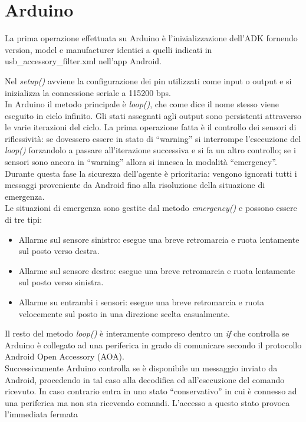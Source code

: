 \section {Arduino} 
La prima operazione effettuata su Arduino è l'inizializzazione dell'ADK fornendo 
version, model e manufacturer identici a quelli indicati in usb\_accessory\_filter.xml 
nell'app Android.

Nel \emph{setup()} avviene la configurazione dei pin utilizzati come input o output e si inizializza
la connessione seriale a 115200 bps.\\
In Arduino il metodo principale è \emph{loop()}, che come dice il nome stesso viene eseguito
in ciclo infinito. Gli stati assegnati agli output sono persistenti attraverso 
le varie iterazioni del ciclo.
La prima operazione fatta è il controllo dei sensori di riflessività: se dovessero 
essere in stato di ``warning'' si interrompe l'esecuzione del \emph{loop()} 
forzandolo a passare all'iterazione successiva e si fa un altro controllo; se i 
sensori sono ancora in ``warning'' allora si innesca la modalità ``emergency''.
Durante questa fase la sicurezza dell'agente è prioritaria: vengono ignorati tutti 
i messaggi proveniente da Android fino alla risoluzione della situazione di emergenza.\\
Le situazioni di emergenza sono gestite dal metodo \emph{emergency()} e possono 
essere di tre tipi:
\begin{itemize}
	\item Allarme sul sensore sinistro: esegue una breve retromarcia 
	e ruota lentamente sul posto verso destra.
	\item Allarme sul sensore destro: esegue una breve retromarcia 
	e ruota lentamente sul posto verso sinistra.
	\item Allarme su entrambi i sensori: esegue una breve retromarcia 
	e ruota velocemente sul posto in una direzione scelta casualmente.
\end{itemize}
Il resto del metodo \emph{loop()} è interamente compreso dentro un
\emph{if} che controlla se Arduino è collegato ad una periferica in grado di 
comunicare secondo il protocollo Android Open Accessory (AOA).\\
Successivamente Arduino controlla se è disponibile un messaggio inviato da Android, 
procedendo in tal caso alla decodifica ed all'esecuzione del comando ricevuto. 
In caso contrario entra in uno stato ``conservativo'' in cui è connesso ad una periferica 
ma non sta ricevendo comandi. L'accesso a questo stato provoca l'immediata fermata 
